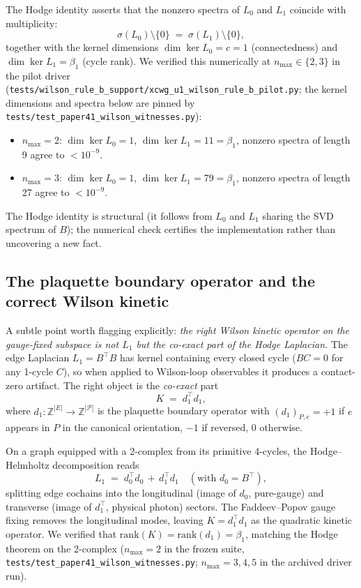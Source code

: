 \documentclass[11pt]{article}
\begin{document}
The Hodge identity asserts that the nonzero spectra of $L_0$ and $L_1$ coincide
with multiplicity:
\begin{equation}
\sigma(L_0)\setminus\{0\}\;=\;\sigma(L_1)\setminus\{0\},
\end{equation}
together with the kernel dimensions $\dim\ker L_0=c=1$ (connectedness) and
$\dim\ker L_1=\beta_1$ (cycle rank). We verified this numerically at
$n_\text{max}\in\{2,3\}$ in the pilot driver
(\texttt{tests/wilson\_rule\_b\_support/xcwg\_u1\_wilson\_rule\_b\_pilot.py};
the kernel dimensions and spectra below are pinned by
\texttt{tests/test\_paper41\_wilson\_witnesses.py}):

\begin{itemize}
\item $n_\text{max}=2$: $\dim\ker L_0=1$, $\dim\ker L_1=11=\beta_1$, nonzero
spectra of length 9 agree to $<10^{-9}$.
\item $n_\text{max}=3$: $\dim\ker L_0=1$, $\dim\ker L_1=79=\beta_1$, nonzero
spectra of length 27 agree to $<10^{-9}$.
\end{itemize}

The Hodge identity is structural (it follows from $L_0$ and $L_1$ sharing
the SVD spectrum of $B$); the numerical check certifies the implementation
rather than uncovering a new fact.

\subsection{The plaquette boundary operator and the correct Wilson kinetic}
\label{sec:plaquette_boundary}

A subtle point worth flagging explicitly: \emph{the right Wilson kinetic
operator on the gauge-fixed subspace is not $L_1$ but the co-exact part of the
Hodge Laplacian.} The edge Laplacian $L_1=B^\top B$ has kernel containing every
closed cycle ($BC=0$ for any 1-cycle $C$), so when applied to Wilson-loop
observables it produces a contact-zero artifact. The right object is the
\emph{co-exact} part
\begin{equation}
K\;=\;d_1^\top d_1,
\label{eq:wilson_kinetic}
\end{equation}
where $d_1:\mathbb{Z}^{|E|}\to\mathbb{Z}^{|\mathcal P|}$ is the plaquette
boundary operator with $(d_1)_{P,e}=+1$ if $e$ appears in $P$ in the canonical
orientation, $-1$ if reversed, $0$ otherwise.

On a graph equipped with a 2-complex from its primitive 4-cycles, the
Hodge--Helmholtz decomposition reads
\begin{equation}
L_1\;=\;d_0^\top d_0\,+\,d_1^\top d_1\quad(\text{with }d_0=B^\top),
\end{equation}
splitting edge cochains into the longitudinal (image of $d_0$, pure-gauge)
and transverse (image of $d_1^\top$, physical photon) sectors. The Faddeev--Popov
gauge fixing removes the longitudinal modes, leaving $K=d_1^\top d_1$ as the
quadratic kinetic operator. We verified that
$\mathrm{rank}(K)=\mathrm{rank}(d_1)=\beta_1$, matching the Hodge theorem on
the 2-complex ($n_\text{max}=2$ in the frozen suite,
\texttt{tests/test\_paper41\_wilson\_witnesses.py}; $n_\text{max}=3,4,5$
in the archived driver run).
\end{document}
